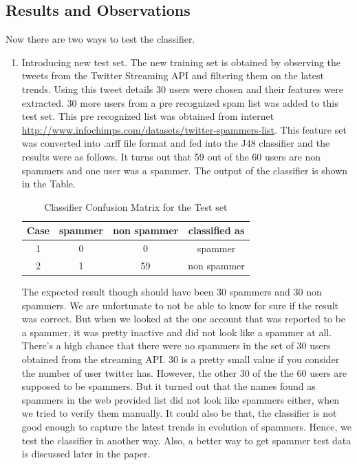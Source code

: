 \documentclass[11pt]{article}
\begin{document}
\subsection {Results and Observations}
Now there are two ways to test the classifier.
\begin{enumerate}
\item Introducing new test set. The new training set is obtained by observing the tweets from the Twitter Streaming API and filtering them on the latest trends. Using this tweet details 30 users were chosen and their features were extracted. 30 more users from a pre recognized spam list was added to this test set. This pre recognized list was obtained from internet \url{http://www.infochimps.com/datasets/twitter-spammers-list}. This feature set was converted into .arff file format and fed into the J48 classifier and the results were as follows. It turns out that 59 out of the 60 users are non spammers and one user was a spammer. The output of the classifier is shown in the Table.

\begin{table}[ht] 
\caption{Classifier Confusion Matrix for the Test set} %
\centering %
\begin{tabular}{c c c c} %
\hline\hline %
Case & spammer & non spammer & classified as \\ [0.5ex] %
\hline %
1 & 0 & 0 & spammer \\ %
2 & 1 & 59 & non spammer \\ [1ex] %
\hline %
\end{tabular} 
\label{table:nonlin} %
\end{table}

The expected result though should have been 30 spammers and 30 non spammers. We are unfortunate to not be able to know for sure if the result was correct. But when we looked at the one account that was reported to be a spammer, it was pretty inactive and did not look like a spammer at all. There's a high chance that there were no spammers in the set of 30 users obtained from the streaming API. 30 is a pretty small value if you consider the number of user twitter has. However, the other 30 of the the 60 users are supposed to be spammers. But it turned out that the names found as spammers in the web provided list did not look like spammers either, when we tried to verify them manually. It could also be that, the classifier is not good enough to capture the latest trends in evolution of spammers. Hence, we test the classifier in another way. Also, a better way to get spammer test data is discussed later in the paper.


\end{enumerate}
\end{document}
